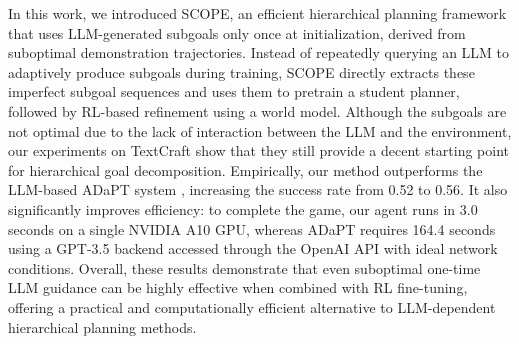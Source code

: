 In this work, we introduced SCOPE, an efficient hierarchical planning framework that uses LLM-generated subgoals only once at initialization, derived from suboptimal demonstration trajectories. Instead of repeatedly querying an LLM to adaptively produce subgoals during training, SCOPE directly extracts these imperfect subgoal sequences and uses them to pretrain a student planner, followed by RL-based refinement using a world model. Although the subgoals are not optimal due to the lack of interaction between the LLM and the environment, our experiments on TextCraft show that they still provide a decent starting point for hierarchical goal decomposition. Empirically, our method outperforms the LLM-based ADaPT system \citep{PrasadKHCSBK2024}, increasing the success rate from 0.52 to 0.56. It also significantly improves efficiency: to complete the game, our agent runs in 3.0 seconds on a single NVIDIA A10 GPU, whereas ADaPT requires 164.4 seconds using a GPT-3.5 backend accessed through the OpenAI API with ideal network conditions. Overall, these results demonstrate that even suboptimal one-time LLM guidance can be highly effective when combined with RL fine-tuning, offering a practical and computationally efficient alternative to LLM-dependent hierarchical planning methods.